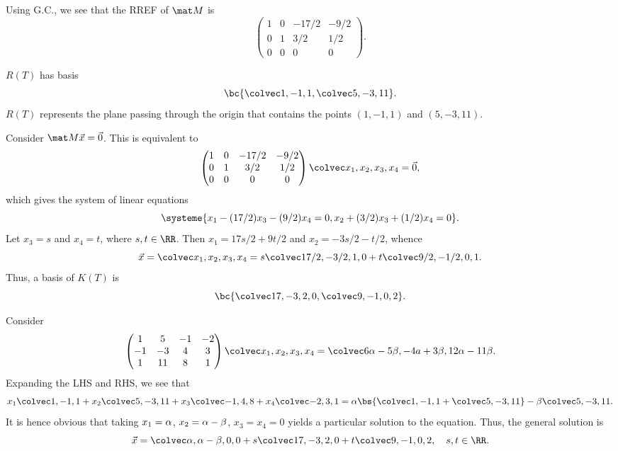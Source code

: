 \begin{solution}
    \begin{ppart}
        Using G.C., we see that the RREF of $\mat M$ is \[\begin{pmatrix}1 & 0 & -17/2 & -9/2 \\ 0 & 1 & 3/2 & 1/2 \\ 0 & 0 & 0 & 0\end{pmatrix}.\]

        \begin{psubpart}
            $R(T)$ has basis \[\bc{\cveciii1{-1}{1}, \cveciii{5}{-3}{11}}.\] $R(T)$ represents the plane passing through the origin that contains the points $(1, -1, 1)$ and $(5, -3, 11)$.
        \end{psubpart}
        \begin{psubpart}
            Consider $\mat M \vec x = \vec 0$. This is equivalent to \[\begin{pmatrix}1 & 0 & -17/2 & -9/2 \\ 0 & 1 & 3/2 & 1/2 \\ 0 & 0 & 0 & 0\end{pmatrix} \cveciv{x_1}{x_2}{x_3}{x_4} = \vec 0,\] which gives the system of linear equations \[\systeme{x_1 - (17/2) x_3 - (9/2) x_4 = 0, x_2 + (3/2) x_3 + (1/2) x_4 = 0}.\] Let $x_3 = s$ and $x_4 = t$, where $s, t \in \RR$. Then $x_1 = 17s/2 + 9t/2$ and $x_2 = -3s/2 - t/2$, whence \[\vec x = \cveciv{x_1}{x_2}{x_3}{x_4} = s \cveciv{17/2}{-3/2}{1}{0} + t \cveciv{9/2}{-1/2}{0}{1}.\] Thus, a basis of $K(T)$ is \[\bc{\cveciv{17}{-3}{2}{0}, \cveciv{9}{-1}{0}{2}}.\]
        \end{psubpart}
        \begin{psubpart}
            Consider \[\begin{pmatrix}1 & 5 & -1 & -2 \\ -1 & -3 & 4 & 3 \\ 1 & 11 & 8 & 1\end{pmatrix} \cveciv{x_1}{x_2}{x_3}{x_4} = \cveciii{6\a - 5\b}{-4a + 3\b}{12\a - 11\b}.\] Expanding the LHS and RHS, we see that \[x_1 \cveciii1{-1}1 + x_2 \cveciii5{-3}{11} + x_3 \cveciii{-1}{4}{8} + x_4 \cveciii{-2}{3}1 = \a \bs{\cveciii1{-1}{1} + \cveciii{5}{-3}{11}} - \b \cveciii{5}{-3}{11}.\] It is hence obvious that taking $x_1 = \alpha$, $x_2 = \alpha - \beta$, $x_3 = x_4 = 0$ yields a particular solution to the equation. Thus, the general solution is \[\vec x = \cveciv{\a}{\a - \b}00 + s \cveciv{17}{-3}{2}{0} + t \cveciv{9}{-1}{0}{2}, \quad s, t \in \RR.\]
        \end{psubpart}

\end{ppart}
\end{solution}
